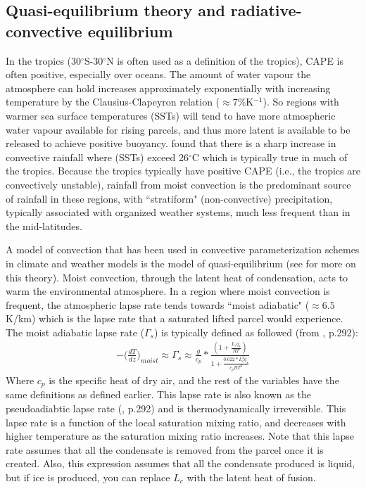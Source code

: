 \documentclass[letterpaper,12pt,titlepage,oneside,final]{book}
\begin{document}
\subsection{Quasi-equilibrium theory and radiative-convective equilibrium}\label{QET}

In the tropics (30$^\circ$S-30$^\circ$N is often used as a definition of the tropics), CAPE is often positive, especially over oceans. The amount of water vapour the atmosphere can hold increases approximately exponentially with increasing temperature by the Clausius-Clapeyron relation ($\approx {7\%}$K$^{-1}$). So regions with warmer sea surface temperatures (SSTs) will tend to have more atmospheric water vapour available for rising parcels, and thus more latent is available to be released to achieve positive buoyancy. \citep{folkins_ian_tropical_2003} found that there is a sharp increase in convective rainfall where (SSTs) exceed 26$^{\circ}$C which is typically true in much of the tropics. Because the tropics typically have positive CAPE (i.e., the tropics are convectively unstable), rainfall from moist convection is the predominant source of rainfall in these regions, with ``stratiform" (non-convective) precipitation, typically associated with organized weather systems, much less frequent than in the mid-latitudes.

A model of convection that has been used in convective parameterization schemes in climate and weather models is the model of quasi-equilibrium \citep{arakawa_and_schubert_interaction_1974} (see \cite{emanuel_quasi-equilibrium_2007} for more on this theory). Moist convection, through the latent heat of condensation, acts to warm the environmental atmosphere. In a region where moist convection is frequent, the atmospheric lapse rate tends towards ``moist adiabatic" ($\approx 6.5$K/km) which is the lapse rate that a saturated lifted parcel would experience. The moist adiabatic lapse rate ($\Gamma_{s}$) is typically defined as followed (from \cite{holton_introduction_2004}, p.292):
\begin{align}
-\Big(\frac{dT}{dz}\Big)_{moist}\approx\Gamma_{s}\approx\frac{g}{c_{p}}*\frac{(1+\frac{L_{c}q_{s}}{RT})}{1+\frac{0.622*L_{c}^{2}q_{s}}{c_{p}RT^{2}}}
\end{align}
Where $c_{p}$ is the specific heat of dry air, and the rest of the variables have the same definitions as defined earlier. This lapse rate is also known as the pseudoadiabtic lapse rate (\cite{holton_introduction_2004}, p.292) and is thermodynamically irreversible.
This lapse rate is a function of the local saturation mixing ratio, and decreases with higher temperature as the saturation mixing ratio increases. Note that this lapse rate assumes that all the condensate is removed from the parcel once it is created. Also, this expression assumes that all the condensate produced is liquid, but if ice is produced, you can replace $L_{c}$ with the latent heat of fusion.
\end{document}
